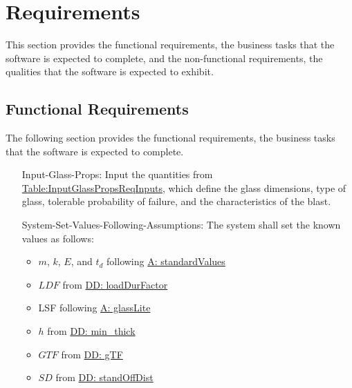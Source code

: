 \documentclass[12pt]{article}
\begin{document}
\section{Requirements}
\label{Sec:Requirements}
This section provides the functional requirements, the business tasks that the software is expected to complete, and the non-functional requirements, the qualities that the software is expected to exhibit.
\subsection{Functional Requirements}
\label{Sec:FRs}
The following section provides the functional requirements, the business tasks that the software is expected to complete.
\begin{itemize}
\item[Input-Glass-Props:\phantomsection\label{inputGlassProps}]Input the quantities from \hyperref[Table:InputGlassPropsReqInputs]{Table:InputGlassPropsReqInputs}, which define the glass dimensions, type of glass, tolerable probability of failure, and the characteristics of the blast.
\item[System-Set-Values-Following-Assumptions:\phantomsection\label{sysSetValsFollowingAssumps}]The system shall set the known values as follows:
                                                                                                \begin{itemize}
                                                                                                \item{$m$, $k$, $E$, and ${t_{d}}$ following \hyperref[assumpSV]{A: standardValues}}
                                                                                                \item{$LDF$ from \hyperref[DD:loadDurFactor]{DD: loadDurFactor}}
                                                                                                \item{LSF following \hyperref[assumpGL]{A: glassLite}}
                                                                                                \item{$h$ from \hyperref[DD:min.thick]{DD: min\_thick}}
                                                                                                \item{$GTF$ from \hyperref[DD:gTF]{DD: gTF}}
                                                                                                \item{$SD$ from \hyperref[DD:standOffDist]{DD: standOffDist}}

\end{itemize}
\end{itemize}
\end{document}
